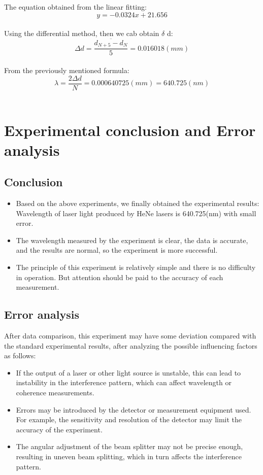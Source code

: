 \documentclass[UTF8]{article}
\begin{document}
The equation obtained from the linear fitting:\\
\[y=-0.0324x+21.656\]\\

Using the differential method, then we cab obtain $\delta$ d:\\
\[\Delta d=\frac{\overline{d_{N+5} -d_N} }{5} =0.016018(mm)\]\\

From the previously mentioned formula:\\
\[\lambda =\frac{2\Delta d}{N} =0.000640725(mm)=640.725(nm)\]\\


	
 \section{Experimental conclusion and Error analysis}
	\subsection{Conclusion}

	\begin{itemize}
	\item Based on the above experiments, we finally obtained the experimental results: Wavelength of laser light produced by HeNe lasers is 640.725(nm) with small error.
	\item The wavelength measured by the experiment is clear, the data is accurate, and the results are normal, so the experiment is more successful.
	\item The principle of this experiment is relatively simple and there is no difficulty in operation. But attention should be paid to the accuracy of each measurement.
	\end{itemize}

	\subsection{Error analysis}
	After data comparison, this experiment may have some deviation compared with the standard experimental results, after analyzing the possible influencing factors as follows:
	\begin{itemize}
	\item If the output of a laser or other light source is unstable, this can lead to instability in the interference pattern, which can affect wavelength or coherence measurements.
	\item Errors may be introduced by the detector or measurement equipment used. For example, the sensitivity and resolution of the detector may limit the accuracy of the experiment.
	\item The angular adjustment of the beam splitter may not be precise enough, resulting in uneven beam splitting, which in turn affects the interference pattern.
	\end{itemize}
\end{document}
